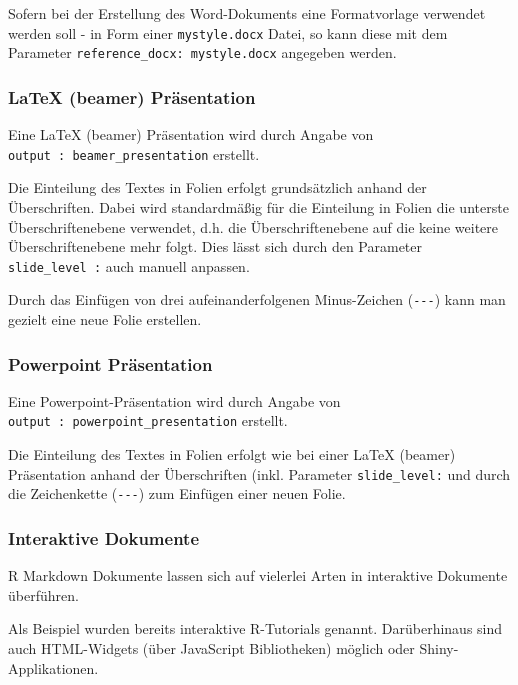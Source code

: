 \documentclass[
]{article}
\begin{document}
Sofern bei der Erstellung des Word-Dokuments eine Formatvorlage
verwendet werden soll - in Form einer \texttt{mystyle.docx} Datei, so
kann diese mit dem Parameter \texttt{reference\_docx:\ mystyle.docx}
angegeben werden.

\hypertarget{latex-beamer-pruxe4sentation}{%
\subsubsection{LaTeX (beamer)
Präsentation}\label{latex-beamer-pruxe4sentation}}

Eine LaTeX (beamer) Präsentation wird durch Angabe von
\texttt{output\ :\ beamer\_presentation} erstellt.

Die Einteilung des Textes in Folien erfolgt grundsätzlich anhand der
Überschriften. Dabei wird standardmäßig für die Einteilung in Folien die
unterste Überschriftenebene verwendet, d.h. die Überschriftenebene auf
die keine weitere Überschriftenebene mehr folgt. Dies lässt sich durch
den Parameter \texttt{slide\_level\ :} auch manuell anpassen.

Durch das Einfügen von drei aufeinanderfolgenen Minus-Zeichen
(\texttt{-\/-\/-}) kann man gezielt eine neue Folie erstellen.

\hypertarget{powerpoint-pruxe4sentation}{%
\subsubsection{Powerpoint
Präsentation}\label{powerpoint-pruxe4sentation}}

Eine Powerpoint-Präsentation wird durch Angabe von
\texttt{output\ :\ powerpoint\_presentation} erstellt.

Die Einteilung des Textes in Folien erfolgt wie bei einer LaTeX (beamer)
Präsentation anhand der Überschriften (inkl. Parameter
\texttt{slide\_level:} und durch die Zeichenkette (\texttt{-\/-\/-}) zum
Einfügen einer neuen Folie.

\hypertarget{interaktive-dokumente}{%
\subsubsection{Interaktive Dokumente}\label{interaktive-dokumente}}

R Markdown Dokumente lassen sich auf vielerlei Arten in interaktive
Dokumente überführen.

Als Beispiel wurden bereits interaktive R-Tutorials genannt.
Darüberhinaus sind auch HTML-Widgets (über JavaScript Bibliotheken)
möglich oder Shiny-Applikationen.
\end{document}
